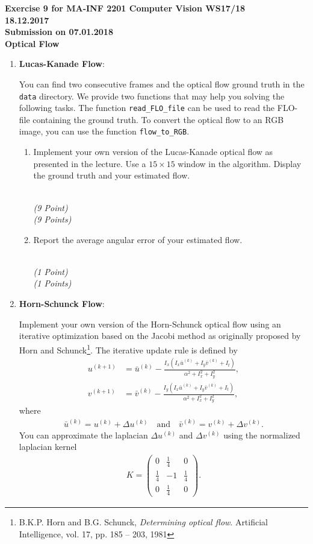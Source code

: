 \documentclass[11pt]{article}
\newcommand{\points}[1]{
    \ifthenelse{\equal{#1}{1}}
        {\\ \emph{(#1 Point)}}
        {\\ \emph{(#1 Points)}}
}
\begin{document}
\begin{center}
\textbf{Exercise 9 for MA-INF 2201 Computer Vision WS17/18\\
18.12.2017\\
Submission on 07.01.2018\\
Optical Flow}\\
\end{center}

\vspace{1cm}

\begin{enumerate}
    \item \textbf{Lucas-Kanade Flow}:

        You can find two consecutive frames and the optical flow ground truth in the \texttt{data} directory. We provide two functions that may help you solving the following tasks.
        The function \texttt{read\_FLO\_file} can be used to read the FLO-file containing the ground truth. To convert the optical flow to an RGB image, you can use the function \texttt{flow\_to\_RGB}.
        \begin{enumerate}
            \item Implement your own version of the Lucas-Kanade optical flow as presented in the lecture. Use a $ 15 \times 15 $ window in the algorithm. Display the ground truth and your estimated flow.
            \points{9}
            \item Report the average angular error of your estimated flow.
            \points{1}
        \end{enumerate}
    \item \textbf{Horn-Schunck Flow}:

    Implement your own version of the Horn-Schunck optical flow using an iterative optimization based on the Jacobi method as originally proposed by Horn and Schunck\footnote{B.K.P. Horn and B.G. Schunck, \textit{Determining optical flow}. Artificial Intelligence, vol. 17, pp. 185 -- 203, 1981}.
    The iterative update rule is defined by
    \begin{align}
        u^{(k+1)} &= \bar u^{(k)} - \frac{I_x(I_x \bar u^{(k)} + I_y \bar v^{(k)} + I_t)}{\alpha^2 + I_x^2 + I_y^2}, \\
        v^{(k+1)} &= \bar v^{(k)} - \frac{I_y(I_x \bar u^{(k)} + I_y \bar v^{(k)} + I_t)}{\alpha^2 + I_x^2 + I_y^2},
    \end{align}
    where
    \begin{align}
        \bar u^{(k)} = u^{(k)} + \Delta u^{(k)} \quad \text{and} \quad
        \bar v^{(k)} = v^{(k)} + \Delta v^{(k)}.
    \end{align}
    You can approximate the laplacian $ \Delta u^{(k)} $ and $ \Delta v^{(k)} $ using the normalized laplacian kernel
    \begin{align}
        K = \begin{pmatrix} 0 & \frac{1}{4} & 0 \\ \frac{1}{4} & -1 & \frac{1}{4} \\ 0 & \frac{1}{4} & 0 \end{pmatrix}.
    \end{align}


\end{enumerate}
\end{document}
